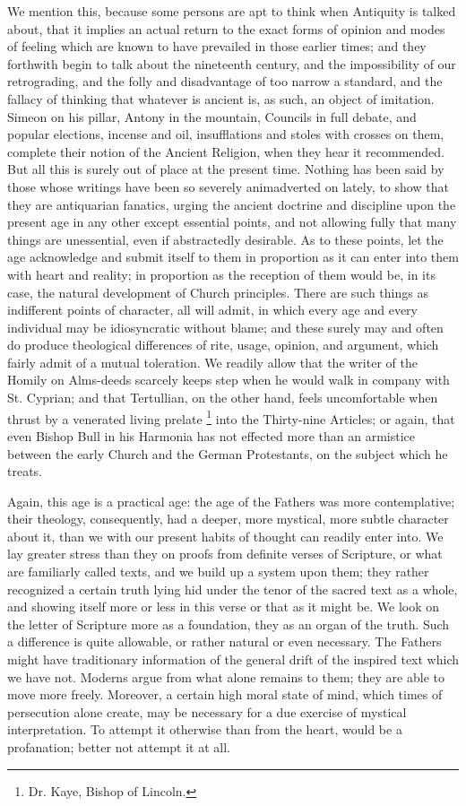 We mention this, because some persons are apt to
think when Antiquity is talked about, that it implies an actual return
to the exact forms of opinion and modes of feeling which are known to
have prevailed in those earlier times; and they forthwith begin to
talk about the nineteenth century, and the impossibility of our
retrograding, and the folly and disadvantage of too narrow a standard,
and the fallacy of thinking that whatever is ancient is, as such, an
object of imitation. Simeon on his pillar, Antony in the mountain,
Councils in full debate, and popular elections, incense and oil,
insufflations and stoles with crosses on them, complete their notion
of the Ancient Religion, when they hear it recommended. But all this
is surely out of place at the present time. Nothing has been said by
those whose writings have been so severely animadverted on lately, to
show that they are antiquarian fanatics, urging the ancient doctrine
and discipline upon the present age in any other except essential
points, and not allowing fully that many things are unessential, even
if abstractedly desirable. As to these points, let the age acknowledge
and submit itself to them in proportion as it can enter into
them with heart and reality; in proportion as the reception of them
would be, in its case, the natural development of Church principles.
There are such things as indifferent points of character, all will
admit, in which every age and every individual may be idiosyncratic
without blame; and these surely may and often do produce theological
differences of rite, usage, opinion, and argument, which fairly admit
of a mutual toleration. We readily allow that the writer of the Homily
on Alms-deeds scarcely keeps step when he would walk in company with
St. Cyprian; and that Tertullian, on the other hand, feels
uncomfortable when thrust by a venerated living prelate \footnote{Dr. Kaye, Bishop of Lincoln.} into the Thirty-nine Articles; or again, that even Bishop Bull
in his Harmonia has not effected more than an armistice between the
early Church and the German Protestants, on the subject which he
treats.

Again, this age is a practical age: the age of
the Fathers was more contemplative; their theology, consequently, had
a deeper, more mystical, more subtle character about it, than we with
our present habits of thought can readily enter into. We lay greater
stress than they on proofs from definite verses of Scripture, or what
are familiarly called texts, and we build up a system upon them; they
rather recognized a certain truth lying hid under the tenor of the
sacred text as a whole, and showing itself more or less in this verse
or that as it might be. We look on the letter of Scripture more as a
foundation, they as an organ of the truth. Such a difference is quite
allowable, or rather natural or even necessary. The Fathers might have
traditionary information of the general drift of the inspired text
which we have not. Moderns argue from what alone remains to them; they
are able to move more freely. Moreover, a certain high moral
state of mind, which times of persecution alone create, may be
necessary for a due exercise of mystical interpretation. To attempt it
otherwise than from the heart, would be a profanation; better not
attempt it at all.

